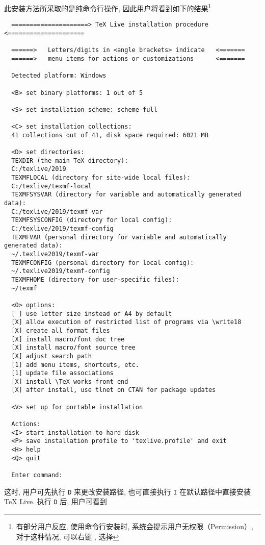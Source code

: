 \documentclass{ctexrep}
\begin{document}
此安装方法所采取的是纯命令行操作, 因此用户将看到如下的结果\footnote{有部分用户反应, 使用命令行安装时, 系统会提示用户无权限（Permission）, 对于这种情况, 可以右键 , 选择 }
\begin{lstlisting}
  =====================> TeX Live installation procedure <=====================
  
  ======>   Letters/digits in <angle brackets> indicate   <=======
  ======>   menu items for actions or customizations      <=======
  
  Detected platform: Windows
  
  <B> set binary platforms: 1 out of 5
  
  <S> set installation scheme: scheme-full
  
  <C> set installation collections:
  41 collections out of 41, disk space required: 6021 MB
  
  <D> set directories:
  TEXDIR (the main TeX directory):
  C:/texlive/2019
  TEXMFLOCAL (directory for site-wide local files):
  C:/texlive/texmf-local
  TEXMFSYSVAR (directory for variable and automatically generated data):
  C:/texlive/2019/texmf-var
  TEXMFSYSCONFIG (directory for local config):
  C:/texlive/2019/texmf-config
  TEXMFVAR (personal directory for variable and automatically generated data):
  ~/.texlive2019/texmf-var
  TEXMFCONFIG (personal directory for local config):
  ~/.texlive2019/texmf-config
  TEXMFHOME (directory for user-specific files):
  ~/texmf
  
  <O> options:
  [ ] use letter size instead of A4 by default
  [X] allow execution of restricted list of programs via \write18
  [X] create all format files
  [X] install macro/font doc tree
  [X] install macro/font source tree
  [X] adjust search path
  [1] add menu items, shortcuts, etc.
  [1] update file associations
  [X] install \TeX works front end
  [X] after install, use tlnet on CTAN for package updates
  
  <V> set up for portable installation
  
  Actions:
  <I> start installation to hard disk
  <P> save installation profile to 'texlive.profile' and exit
  <H> help
  <Q> quit
  
  Enter command:
\end{lstlisting}
这时, 用户可先执行 \texttt{D} 来更改安装路径, 也可直接执行 \texttt{I} 在默认路径中直接安装 \TeX{} Live. 
执行 \texttt{D} 后, 用户可看到
\end{document}
